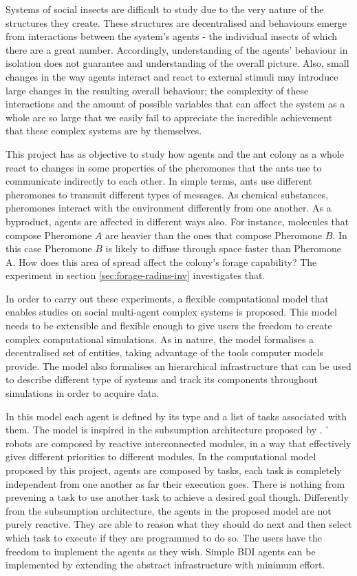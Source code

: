 Systems of social insects are difficult to study due to the very nature of the structures they create. These structures are decentralised and behaviours emerge from interactions between the system's agents - the individual insects of which there are a great number. Accordingly, understanding of the agents' behaviour in isolation does not guarantee and understanding of the overall picture. Also, small changes in the way agents interact and react to external stimuli may introduce large changes in the resulting overall behaviour; the complexity of these interactions and the amount of possible variables that can affect the system as a whole are so large that we easily fail to appreciate the incredible achievement that these complex systems are by themselves.

This project has as objective to study how agents and the ant colony as a whole react to changes in some properties of the pheromones that the ants use to communicate indirectly to each other. In simple terms, ants use different pheromones to transmit different types of messages. As chemical substances, pheromones interact with the environment differently from one another. As a byproduct, agents are affected in different ways also. For instance, molecules that compose Pheromone $A$ are heavier than the ones that compose Pheromone $B$. In this case Pheromone $B$ is likely to diffuse through space faster than Pheromone A. How does this area of spread affect the colony's forage capability? The experiment in section \ref{sec:forage-radius-inv} investigates that. 

In order to carry out these experiments, a flexible computational model that enables studies on social multi-agent complex systems is proposed. This model needs to be extensible and flexible enough to give users the freedom to create complex computational simulations. As in nature, the model formalises a decentralised set of entities, taking advantage of the tools computer models provide. The model also formalises an hierarchical infrastructure that can be used to describe different type of systems and track its components throughout simulations in order to acquire data.
 
In this model each agent is defined by its type and a list of tasks associated with them. The model is inspired in the subsumption architecture proposed by \citeauthor{1087032} \cite{1087032} \cite{Brooks1986b}. \citeauthor{1087032}' robots are composed by reactive interconnected modules, in a way that effectively gives different priorities to different modules. In the computational model proposed by this project, agents are composed by tasks, each task is completely independent from one another as far their execution goes. There is nothing from prevening a task to use another task to achieve a desired goal though. Differently from the subsumption architecture, the agents in the proposed model are not purely reactive. They are able to reason what they should do next and then select which task to execute if they are programmed to do so. The users have the freedom to implement the agents as they wish. Simple \ac{BDI} \cite{bratman1999intention} \cite{wooldridge2009introduction} agents can be implemented by extending the abstract infrastructure with minimum effort.

